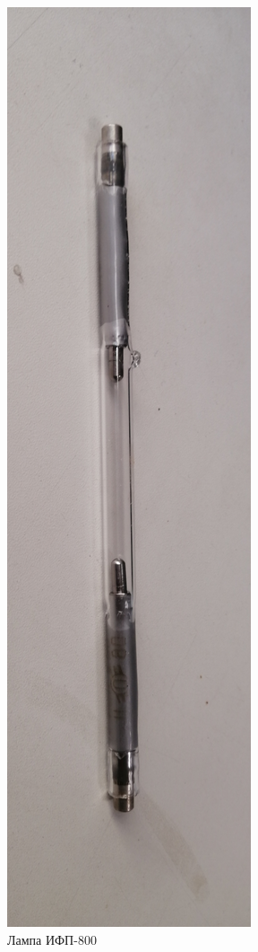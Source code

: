 \documentclass{beamer}
\begin{document}
\begin{frame}
\begin{columns}
\begin{figure}
				\includegraphics[width=\linewidth]{res/lamp_tube_xe.png}
				\caption*{Лампа ИФП-800}
			\end{figure}
		\end{columns}
	\end{frame}	
\end{document}
